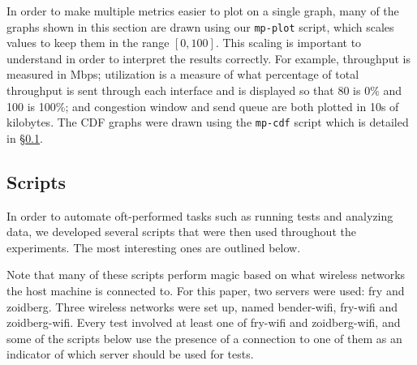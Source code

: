 In order to make multiple metrics easier to plot on a single graph, many of the
graphs shown in this section are drawn using our \texttt{mp-plot} script, which
scales values to keep them in the range $[0,100]$. This scaling is important to
understand in order to interpret the results correctly. For example, throughput
is measured in Mbps; utilization is a measure of what percentage of total
throughput is sent through each interface and is displayed so that 80 is
0\% and 100 is 100\%; and congestion window and send queue are both plotted in
10s of kilobytes. The CDF graphs were drawn using the \texttt{mp-cdf} script
which is detailed in \S\ref{sec:met:scripts}.

\subsection{Scripts}
\label{sec:met:scripts}
In order to automate oft-performed tasks such as running tests and analyzing
data, we developed several scripts that were then used throughout the
experiments. The most interesting ones are outlined below.

Note that many of these scripts perform magic based on what wireless networks
the host machine is connected to. For this paper, two servers were used: fry and
zoidberg. Three wireless networks were set up, named bender-wifi, fry-wifi and
zoidberg-wifi. Every test involved at least one of fry-wifi and zoidberg-wifi,
and some of the scripts below use the presence of a connection to one of them as
an indicator of which server should be used for tests.

